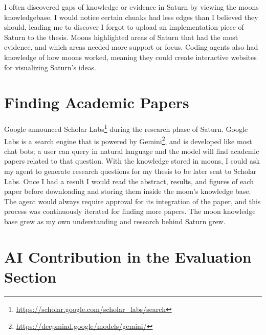 I often discovered gaps of knowledge or evidence in Saturn by viewing the moons knowledgebase. I would notice certain chunks had less edges than I believed they should, leading me to discover I forgot to upload an implementation piece of Saturn to the thesis. Moons highlighted areas of Saturn that had the most evidence, and which areas needed more support or focus. Coding agents also had knowledge of how moons worked, meaning they could create interactive websites for visualizing Saturn's ideas.

\section{Finding Academic Papers}

Google announced Scholar Labs\footnote{\url{https://scholar.google.com/scholar_labs/search}} during the research phase of Saturn. Google Labs is a search engine that is powered by Gemini\footnote{\url{https://deepmind.google/models/gemini/}}, and is developed like most chat bots; a user can query in natural language and the model will find academic papers related to that question. With the knowledge stored in moons, I could ask my agent to generate research questions for my thesis to be later sent to Scholar Labs. Once I had a result I would read the abstract, results, and figures of each paper before downloading and storing them inside the moon's knowledge base. The agent would always require approval for its integration of the paper, and this process was continuously iterated for finding more papers. The moon knowledge base grew as my own understanding and research behind Saturn grew.

\section{AI Contribution in the Evaluation Section}

